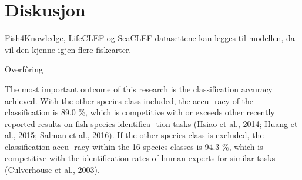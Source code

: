 




\section{Diskusjon}

Fish4Knowledge, LifeCLEF og SeaCLEF datasettene kan legges til modellen, da vil den kjenne igjen flere fiskearter.

Overfôring

The most important outcome of this research is the classification accuracy achieved. With the other species class included, the accu- racy of the classification is 89.0 \%, which is competitive with or exceeds other recently reported results on fish species identifica- tion tasks (Hsiao et al., 2014; Huang et al., 2015; Salman et al., 2016). If the other species class is excluded, the classification accu- racy within the 16 species classes is 94.3 \%, which is competitive with the identification rates of human experts for similar tasks (Culverhouse et al., 2003).